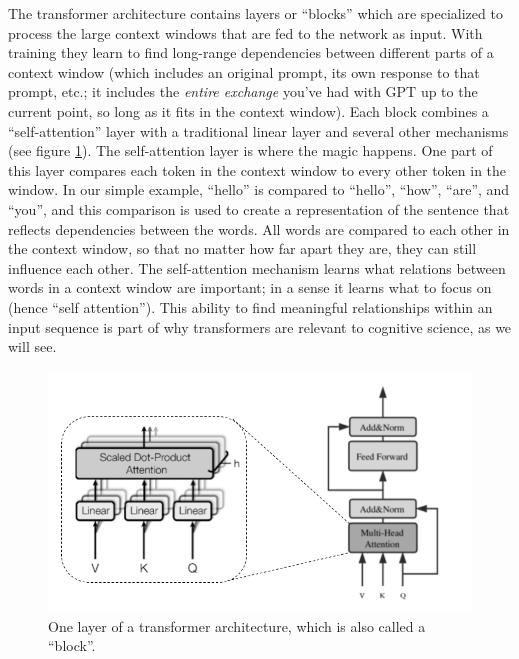 The transformer architecture \cite{vaswani2017attention} contains layers or ``blocks'' which are specialized to process the large context windows that are fed to the network as input. With training they learn to find long-range dependencies between different parts of a context window (which includes an original prompt, its own response to that prompt, etc.; it includes the \emph{entire exchange} you've had with GPT up to the current point, so long as it fits in the context window). Each block combines  a ``self-attention'' layer with a traditional linear layer and several other mechanisms (see figure \ref{transformerBlock}). The self-attention layer is where the magic happens. One part of this layer compares each token in the context window to every other token in the window. In our simple example, ``hello'' is compared to ``hello'', ``how'', ``are'', and ``you'', and this comparison is used to create a representation of the sentence that reflects dependencies between the words. All words are compared to each other in the context window, so that no matter how far apart they are, they can still influence each other. The self-attention mechanism learns what relations between words in a context window are important; in a sense it learns what to focus on (hence ``self attention''). This ability to find meaningful relationships within an input sequence is part of why transformers are relevant to cognitive science, as we will see.

\begin{figure}[h]
\centering
\includegraphics[scale=.4]{./images/transformerBlock.png}
\caption[Jeff Yoshimi modification of Todo.]{One layer of a transformer architecture, which is also called a ``block''. }
\label{transformerBlock}
\end{figure}


